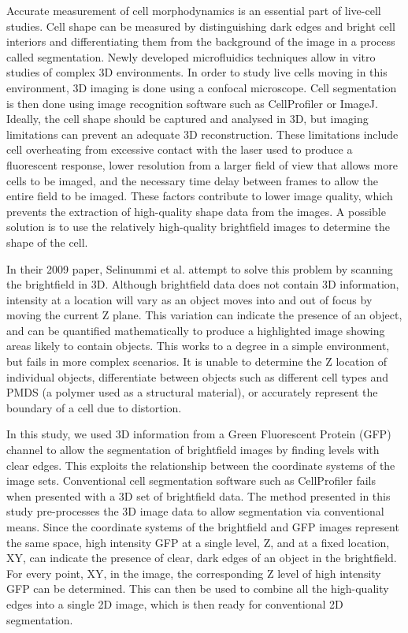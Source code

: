 \documentclass[preprint,11pt,5p,twocolumn]{elsarticle}
\begin{document}
Accurate measurement of cell morphodynamics is an essential part of live-cell studies. Cell shape can be measured by distinguishing dark edges and bright cell interiors and differentiating them from the background of the image in a process called segmentation. Newly developed microfluidics techniques allow in vitro studies of complex 3D environments. In order to study live cells moving in this environment, 3D imaging is done using a confocal microscope. Cell segmentation is then done using image recognition software such as CellProfiler or ImageJ. Ideally, the cell shape should be captured and analysed in 3D, but imaging limitations can prevent an adequate 3D reconstruction. These limitations include cell overheating from excessive contact with the laser used to produce a fluorescent response, lower resolution from a larger field of view that allows more cells to be imaged, and the necessary time delay between frames to allow the entire field to be imaged. These factors contribute to lower image quality, which prevents the extraction of high-quality shape data from the images. A possible solution is to use the relatively high-quality brightfield images to determine the shape of the cell.

In their 2009 paper, Selinummi et al. attempt to solve this problem by scanning the brightfield in 3D. Although brightfield data does not contain 3D information, intensity at a location will vary as an object moves into and out of focus by moving the current Z plane. This variation can indicate the presence of an object, and can be quantified mathematically to produce a highlighted image showing areas likely to contain objects. This works to a degree in a simple environment, but fails in more complex scenarios. It is unable to determine the Z location of individual objects, differentiate between objects such as different cell types and PMDS (a polymer used as a structural material), or accurately represent the boundary of a cell due to distortion.

In this study, we used 3D information from a Green Fluorescent Protein (GFP) channel to allow the segmentation of brightfield images by finding levels with clear edges. This exploits the relationship between the coordinate systems of the image sets. Conventional cell segmentation software such as CellProfiler fails when presented with a 3D set of brightfield data. The method presented in this study pre-processes the 3D image data to allow segmentation via conventional means. Since the coordinate systems of the brightfield and GFP images represent the same space, high intensity GFP at a single level, Z, and at a fixed location, XY, can indicate the presence of clear, dark edges of an object in the brightfield. For every point, XY, in the image, the corresponding Z level of high intensity GFP can be determined. This can then be used to combine all the high-quality edges into a single 2D image, which is then ready for conventional 2D segmentation.
\end{document}
